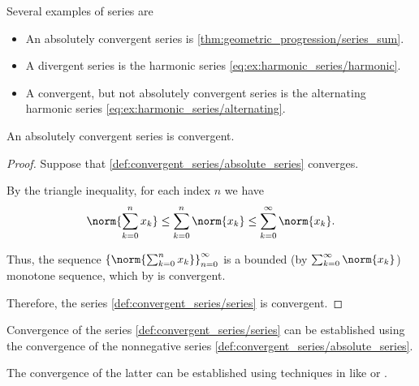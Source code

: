 \begin{example}\label{ex:series}
  Several examples of series are
  \begin{itemize}
    \item An absolutely convergent series is \eqref{thm:geometric_progression/series_sum}.
    \item A divergent series is the harmonic series \eqref{eq:ex:harmonic_series/harmonic}.
    \item A convergent, but not absolutely convergent series is the alternating harmonic series \eqref{eq:ex:harmonic_series/alternating}.
  \end{itemize}
\end{example}

\begin{proposition}\label{thm:absolutely_convergent_series_is_convergent}
  An absolutely convergent series is convergent.
\end{proposition}
\begin{proof}
  Suppose that \eqref{def:convergent_series/absolute_series} converges.

  By the triangle inequality, for each index \( n \) we have
  \begin{equation*}
    \norm{\sum_{k=0}^n x_k} \leq \sum_{k=0}^n \norm{x_k} \leq \sum_{k=0}^\infty \norm{x_k}.
  \end{equation*}

  Thus, the sequence \( \left\{ \norm{\sum_{k=0}^{n} x_k} \right\}_{n=0}^\infty \) is a bounded (by \( \sum_{k=0}^\infty \norm{x_k} \)) monotone sequence, which by  is convergent.

  Therefore, the series \eqref{def:convergent_series/series} is convergent.
\end{proof}

\begin{remark}\label{rem:establish_series_convergence_by_absolute_series}
  Convergence of the series \eqref{def:convergent_series/series} can be established using the convergence of the nonnegative series \eqref{def:convergent_series/absolute_series}.

  The convergence of the latter can be established using techniques in  like  or .
\end{remark}

